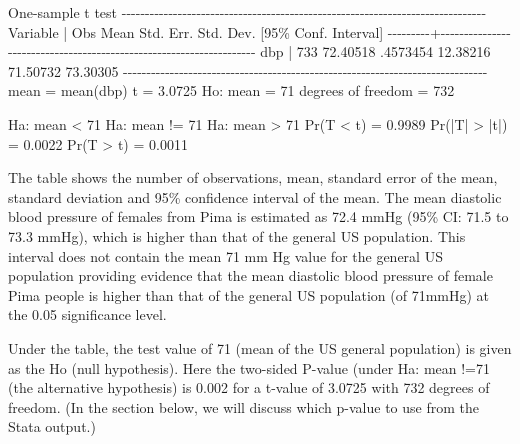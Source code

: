 \documentclass[
]{memoir}
\newenvironment{Shaded}{\begin{snugshade}}{\end{snugshade}}
\newcommand{\NormalTok}[1]{#1}
\begin{document}
\begin{Shaded}
\begin{Highlighting}[]
\NormalTok{One{-}sample t test}
\NormalTok{{-}{-}{-}{-}{-}{-}{-}{-}{-}{-}{-}{-}{-}{-}{-}{-}{-}{-}{-}{-}{-}{-}{-}{-}{-}{-}{-}{-}{-}{-}{-}{-}{-}{-}{-}{-}{-}{-}{-}{-}{-}{-}{-}{-}{-}{-}{-}{-}{-}{-}{-}{-}{-}{-}{-}{-}{-}{-}{-}{-}{-}{-}{-}{-}{-}{-}{-}{-}{-}{-}{-}{-}{-}{-}{-}{-}{-}{-}}
\NormalTok{Variable |     Obs        Mean    Std. Err.   Std. Dev.   [95\% Conf. Interval]}
\NormalTok{{-}{-}{-}{-}{-}{-}{-}{-}{-}+{-}{-}{-}{-}{-}{-}{-}{-}{-}{-}{-}{-}{-}{-}{-}{-}{-}{-}{-}{-}{-}{-}{-}{-}{-}{-}{-}{-}{-}{-}{-}{-}{-}{-}{-}{-}{-}{-}{-}{-}{-}{-}{-}{-}{-}{-}{-}{-}{-}{-}{-}{-}{-}{-}{-}{-}{-}{-}{-}{-}{-}{-}{-}{-}{-}{-}{-}{-}}
\NormalTok{     dbp |     733    72.40518    .4573454    12.38216    71.50732    73.30305}
\NormalTok{{-}{-}{-}{-}{-}{-}{-}{-}{-}{-}{-}{-}{-}{-}{-}{-}{-}{-}{-}{-}{-}{-}{-}{-}{-}{-}{-}{-}{-}{-}{-}{-}{-}{-}{-}{-}{-}{-}{-}{-}{-}{-}{-}{-}{-}{-}{-}{-}{-}{-}{-}{-}{-}{-}{-}{-}{-}{-}{-}{-}{-}{-}{-}{-}{-}{-}{-}{-}{-}{-}{-}{-}{-}{-}{-}{-}{-}{-}}
\NormalTok{    mean = mean(dbp)                                              t =   3.0725}
\NormalTok{Ho: mean = 71                                    degrees of freedom =      732}

\NormalTok{    Ha: mean \textless{} 71               Ha: mean != 71                 Ha: mean \textgreater{} 71}
\NormalTok{ Pr(T \textless{} t) = 0.9989         Pr(|T| \textgreater{} |t|) = 0.0022          Pr(T \textgreater{} t) = 0.0011}
\end{Highlighting}
\end{Shaded}

The table shows the number of observations, mean, standard error of the mean, standard deviation and 95\% confidence interval of the mean. The mean diastolic blood pressure of females from Pima is estimated as 72.4 mmHg (95\% CI: 71.5 to 73.3 mmHg), which is higher than that of the general US population. This interval does not contain the mean 71 mm Hg value for the general US population providing evidence that the mean diastolic blood pressure of female Pima people is higher than that of the general US population (of 71mmHg) at the 0.05 significance level.

Under the table, the test value of 71 (mean of the US general population) is given as the Ho (null hypothesis). Here the two-sided P-value (under Ha: mean !=71 (the alternative hypothesis) is 0.002 for a t-value of 3.0725 with 732 degrees of freedom. (In the section below, we will discuss which p-value to use from the Stata output.)
\end{document}
